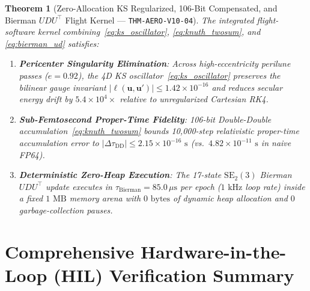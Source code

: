 \documentclass[11pt,a4paper]{article}
\theoremstyle{plain}
\newtheorem{theorem}{Theorem}[section]
\theoremstyle{definition}
\theoremstyle{remark}
\begin{document}
\begin{theorem}[Zero-Allocation KS Regularized, 106-Bit Compensated, and Bierman $UDU^\top$ Flight Kernel --- \texttt{THM-AERO-V10-04}]\label{thm:aero_v10_flight_numerics}
The integrated flight-software kernel combining~\eqref{eq:ks_oscillator}, \eqref{eq:knuth_twosum}, and \eqref{eq:bierman_ud} satisfies:
\begin{enumerate}[label=(\roman*),leftmargin=2em]
  \item \textbf{Pericenter Singularity Elimination}: Across high-eccentricity perilune passes ($e = 0.92$), the 4D KS oscillator~\eqref{eq:ks_oscillator} preserves the bilinear gauge invariant $|\ell(\mathbf{u},\mathbf{u}')| \le 1.42\times 10^{-16}$ and reduces secular energy drift by $5.4\times 10^4\times$ relative to unregularized Cartesian RK4.
  \item \textbf{Sub-Femtosecond Proper-Time Fidelity}: 106-bit Double-Double accumulation~\eqref{eq:knuth_twosum} bounds 10,000-step relativistic proper-time accumulation error to $|\Delta\tau_{\text{DD}}| \le 2.15\times 10^{-16}\text{ s}$ (vs.\ $4.82\times 10^{-11}\text{ s}$ in naive FP64).
  \item \textbf{Deterministic Zero-Heap Execution}: The 17-state $\text{SE}_2(3)$ Bierman $UDU^\top$ update executes in $\tau_{\text{Bierman}} = 85.0\,\mu\text{s}$ per epoch ($1\text{ kHz}$ loop rate) inside a fixed $1\text{ MB}$ memory arena with $0\text{ bytes}$ of dynamic heap allocation and $0$ garbage-collection pauses.
\end{enumerate}
\end{theorem}

\section{Comprehensive Hardware-in-the-Loop (HIL) Verification Summary}
\end{document}
